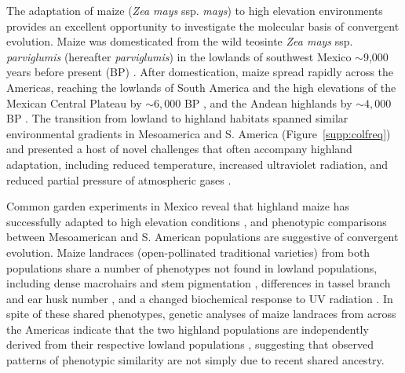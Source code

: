 The adaptation of maize (\emph{Zea mays} ssp. \emph{mays}) to high elevation environments  provides an excellent opportunity to investigate the molecular basis of convergent evolution.  
Maize was domesticated from the wild teosinte \emph{Zea mays} ssp. \emph{parviglumis} (hereafter \emph{parviglumis}) in the lowlands of southwest Mexico $\sim$9,000 years before present (BP) \cite[]{Matsuoka_2002_11983901,Piperno_2009_19307570,vanHeerwaarden_2011_21189301}. 
After domestication, maize spread rapidly across the Americas, reaching the lowlands of South America and the high elevations of the Mexican Central Plateau by $\sim 6,000$ BP \cite[]{Piperno_2006_69}, and the Andean highlands by $\sim 4,000$ BP \cite[]{Perry_2006_16511492,Grobman_2012_22307642}. 
The transition from lowland to highland habitats spanned similar environmental gradients in Mesoamerica and S. America (Figure~\ref{supp:colfreq}) and presented a host of novel challenges that often accompany highland adaptation, including reduced temperature, increased ultraviolet radiation, and reduced partial pressure of atmospheric gases \cite[]{Korner_2007_17988759}. 

Common garden experiments in Mexico reveal that highland maize has successfully adapted to high elevation conditions \cite[]{Mercer2008}, and phenotypic comparisons between Mesoamerican and S. American populations are suggestive of convergent evolution.  
Maize landraces (open-pollinated traditional varieties) from both populations share a number of phenotypes not found in lowland populations, including dense macrohairs and stem pigmentation \cite[]{Wilkes_1977,Wellhausen1957:book}, differences in tassel branch and ear husk number \cite[]{brewbaker2014diversity}, and a changed biochemical response to UV radiation \cite[]{Casati2005}. 
In spite of these shared phenotypes, genetic analyses of maize landraces from across the Americas indicate that the two highland populations are independently derived from their respective lowland populations \cite[]{Vigouroux_2008_21632329, vanHeerwaarden_2011_21189301}, suggesting that observed patterns of phenotypic similarity are not simply due to recent shared ancestry. 

